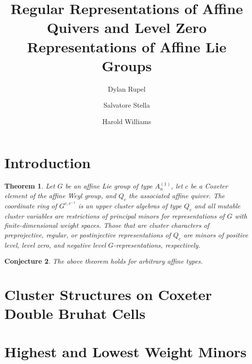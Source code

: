 \documentclass[11pt]{amsart}
\newtheorem{theorem}{Theorem}[section]
\newtheorem{conjecture}[theorem]{Conjecture}
\numberwithin{equation}{section}
\begin{document}
\title{Regular Representations of Affine Quivers and Level Zero Representations of Affine Lie Groups}

\author[Rupel]{Dylan Rupel}
\address[Dylan Rupel]{University of Notre Dame}

\author[Stella]{Salvatore Stella}
\address[Salvatore Stella]{Universit\`a degli studi di Roma ``La Sapienza''}

\author[Williams]{Harold Williams}
\address[Harold Williams]{University of Texas at Austin}

\begin{abstract}
\end{abstract}

\maketitle

\section{Introduction}

\begin{theorem}\label{thm:maintheorem}
Let $G$ be an affine Lie group of type $A_n^{(1)}$, let $c$ be a Coxeter element of the affine Weyl group, and $Q_c$ the associated affine quiver.  The coordinate ring of $G^{c,c^{-1}}$ is an upper cluster algebras of type $Q_c$ and all mutable cluster variables are restrictions of principal minors for representations of $G$ with finite-dimensional weight spaces.  Those that are cluster characters of preprojective, regular, or postinjective representations of $Q_c$ are minors of positive level, level zero, and negative level $G$-representations, respectively.
\end{theorem}

\begin{conjecture}\label{conj:mainconjecture}
The above theorem holds for arbitrary affine types.
\end{conjecture}

\section{Cluster Structures on Coxeter Double Bruhat Cells}

\section{Highest and Lowest Weight Minors}
\end{document}
